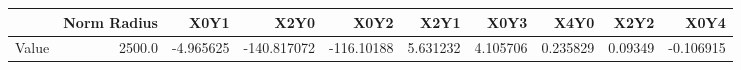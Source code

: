 \documentclass[convert={convertexe={magick.exe}}]{standalone}
\begin{document}
\begin{tabular}{lrrrrrrrrr}
\toprule
{} &  Norm Radius &      X0Y1 &        X2Y0 &       X0Y2 &      X2Y1 &      X0Y3 &      X4Y0 &     X2Y2 &      X0Y4 \\
\midrule
Value &       2500.0 & -4.965625 & -140.817072 & -116.10188 &  5.631232 &  4.105706 &  0.235829 &  0.09349 & -0.106915 \\
\bottomrule
\end{tabular}
\end{document}
